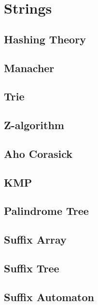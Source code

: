 \section{Strings}
\subsection{Hashing Theory}
\raggedbottom
\subsection{Manacher}
\raggedbottom
\subsection{Trie}
\raggedbottom
\subsection{Z-algorithm}
\raggedbottom
\subsection{Aho Corasick}
\raggedbottom
\subsection{KMP}
\raggedbottom
\subsection{Palindrome Tree}
\raggedbottom
\subsection{Suffix Array}
\raggedbottom
\subsection{Suffix Tree}
\raggedbottom
\subsection{Suffix Automaton}
\raggedbottom

